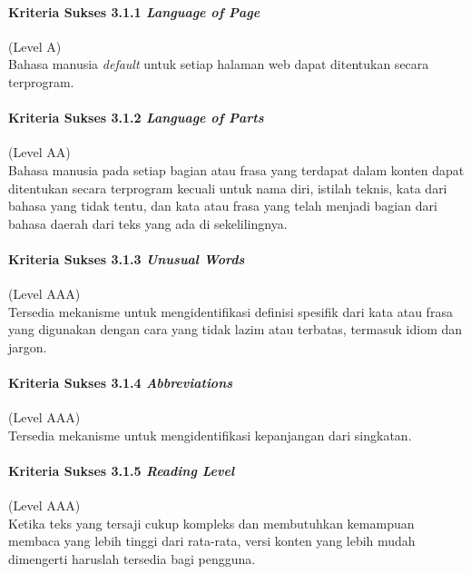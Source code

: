 \documentclass[a4paper,twoside]{article}
\begin{document}
\begin{enumerate}
		\paragraph{Kriteria Sukses 3.1.1 \textit{Language of Page}}
		\label{sec:kriteria_sukses_3.1.1}
		(Level A)\\

		Bahasa manusia \textit{default} untuk setiap halaman web dapat ditentukan secara terprogram.

		\paragraph{Kriteria Sukses 3.1.2 \textit{Language of Parts}}
		\label{sec:kriteria_sukses_3.1.2}
		(Level AA)\\

		Bahasa manusia pada setiap bagian atau frasa yang terdapat dalam konten dapat ditentukan secara terprogram kecuali untuk nama diri, istilah teknis, kata dari bahasa yang tidak tentu, dan kata atau frasa yang telah menjadi bagian dari bahasa daerah dari teks yang ada di sekelilingnya.

		\paragraph{Kriteria Sukses 3.1.3 \textit{Unusual Words}}
		\label{sec:kriteria_sukses_3.1.3}
		(Level AAA)\\

		Tersedia mekanisme untuk mengidentifikasi definisi spesifik dari kata atau frasa yang digunakan dengan cara yang tidak lazim atau terbatas, termasuk idiom dan jargon.

		\paragraph{Kriteria Sukses 3.1.4 \textit{Abbreviations}}
		\label{sec:kriteria_sukses_3.1.4}
		(Level AAA)\\

		Tersedia mekanisme untuk mengidentifikasi kepanjangan dari singkatan.

		\paragraph{Kriteria Sukses 3.1.5 \textit{Reading Level}}
		\label{sec:kriteria_sukses_3.1.5}
		(Level AAA)\\

		Ketika teks yang tersaji cukup kompleks dan membutuhkan kemampuan membaca yang lebih tinggi dari rata-rata, versi konten yang lebih mudah dimengerti haruslah tersedia bagi pengguna.


\end{enumerate}
\end{document}
